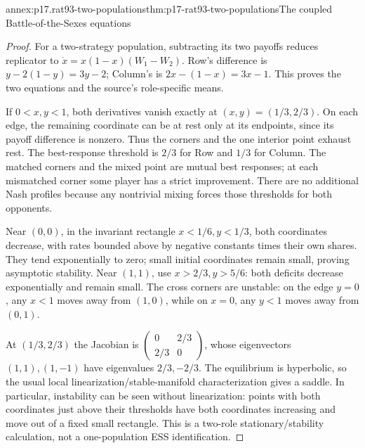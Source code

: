 \begin{annexitem}{annex:p17.rat93-two-populations}{thm:p17-rat93-two-populations}{The coupled Battle-of-the-Sexes equations}
\begin{proof}
For a two-strategy population, subtracting its two payoffs reduces
replicator to \(\dot x=x(1-x)(W_1-W_2)\). Row's difference is
\(y-2(1-y)=3y-2\); Column's is \(2x-(1-x)=3x-1\).
This proves the two equations and the source's role-specific means.

If \(0<x,y<1\), both derivatives vanish exactly at
\((x,y)=(1/3,2/3)\). On each edge, the remaining coordinate
can be at rest only at its endpoints, since its payoff difference
is nonzero. Thus the corners and the one interior point exhaust rest.
The best-response threshold is \(2/3\) for Row and \(1/3\) for
Column. The matched corners and the mixed point are mutual best
responses; at each mismatched corner some player has a strict improvement.
There are no additional Nash profiles because any nontrivial mixing
forces those thresholds for both opponents.

Near \((0,0)\), in the invariant rectangle
\(x<1/6,y<1/3\), both coordinates decrease, with rates bounded
above by negative constants times their own shares. They tend
exponentially to zero; small initial coordinates remain small, proving
asymptotic stability. Near \((1,1)\), use
\(x>2/3,y>5/6\): both deficits decrease exponentially and remain
small. The cross corners are unstable: on the edge \(y=0\),
any \(x<1\) moves away from \((1,0)\), while on \(x=0\), any
\(y<1\) moves away from \((0,1)\).

At \((1/3,2/3)\) the Jacobian is
\(\left(\begin{smallmatrix}0&2/3\\2/3&0\end{smallmatrix}\right)\),
whose eigenvectors \((1,1),(1,-1)\) have eigenvalues
\(2/3,-2/3\). The equilibrium is hyperbolic, so the usual local
linearization/stable-manifold characterization gives a saddle.
In particular, instability can be seen without linearization:
points with both coordinates just above their thresholds have both
coordinates increasing and move out of a fixed small rectangle.
This is a two-role stationary/stability calculation, not a one-population
ESS identification.
\end{proof}
\end{annexitem}

